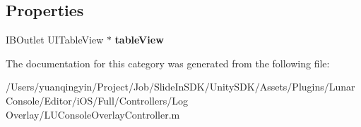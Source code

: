 \subsection*{Properties}
\begin{DoxyCompactItemize}
\item 
\mbox{\label{category_l_u_console_overlay_controller_07_08_a509987955e32de8e47d7d338f8438376}} 
I\+B\+Outlet U\+I\+Table\+View $\ast$ {\bfseries table\+View}
\end{DoxyCompactItemize}


The documentation for this category was generated from the following file\+:\begin{DoxyCompactItemize}
\item 
/\+Users/yuanqingyin/\+Project/\+Job/\+Slide\+In\+S\+D\+K/\+Unity\+S\+D\+K/\+Assets/\+Plugins/\+Lunar\+Console/\+Editor/i\+O\+S/\+Full/\+Controllers/\+Log Overlay/L\+U\+Console\+Overlay\+Controller.\+m\end{DoxyCompactItemize}
